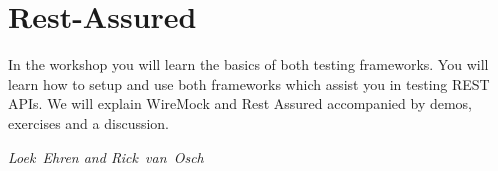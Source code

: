 \section{Rest-Assured}
In the workshop you will learn the basics of both testing
frameworks. You will learn how to setup and use both frameworks which
assist you in testing REST APIs. We will explain WireMock and Rest
Assured accompanied by demos, exercises and a discussion.

\hfill\textit{Loek~Ehren and Rick~van~Osch}